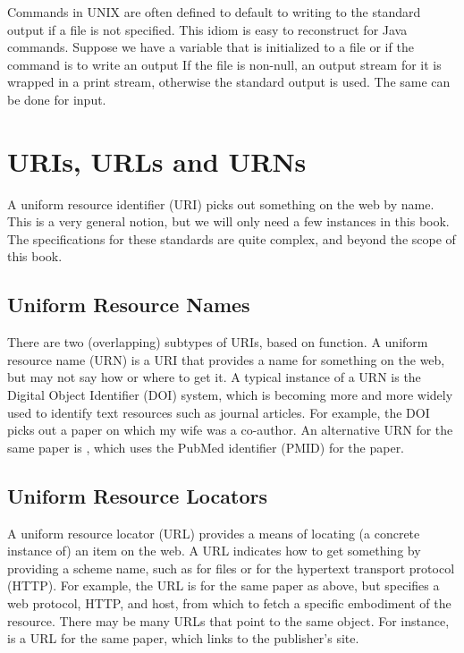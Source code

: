 Commands in UNIX are often defined to default to writing to the
standard output if a file is not specified.  This idiom is easy to
reconstruct for Java commands.  Suppose we have a variable 
that is initialized to a file or  if the command is to
write an output
%
%
If the file is non-null, an output stream for it is wrapped
in a print stream, otherwise the standard output is used.
The same can be done for input.

\section{URIs, URLs and URNs}\label{section:uri-url-urn}

A uniform resource identifier (URI) picks out something on the web by
name.  This is a very general notion, but we will only need a few
instances in this book.  The specifications for these standards are
quite complex, and beyond the scope of this book.  

\subsection{Uniform Resource Names}

There are two (overlapping) subtypes of URIs, based on function.  A
uniform resource name (URN) is a URI that provides a name for
something on the web, but may not say how or where to get it.  A
typical instance of a URN is the Digital Object Identifier (DOI)
system, which is becoming more and more widely used to identify text
resources such as journal articles.  For example, the DOI
 picks out a paper on which my
wife was a co-author.  An alternative URN for the same paper is
, which uses the PubMed identifier (PMID) for the
paper.

\subsection{Uniform Resource Locators}

A uniform resource locator (URL) provides a means of locating (a
concrete instance of) an item on the web.  A URL indicates how to get
something by providing a scheme name, such as  for files
or  for the hypertext transport protocol (HTTP).  For
example, the URL
 is for the same
paper as above, but specifies a web protocol, HTTP, and host,
 from which to fetch a specific embodiment of
the resource.  There may be many URLs that point to the same object.
For instance, 
is a URL for the same paper, which links to the publisher's site.

